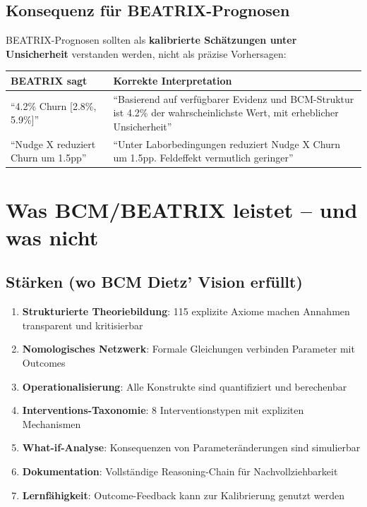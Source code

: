 \documentclass[12pt,a4paper]{article}
\begin{document}
\subsection{Konsequenz für BEATRIX-Prognosen}

BEATRIX-Prognosen sollten als \textbf{kalibrierte Schätzungen unter Unsicherheit} verstanden werden, nicht als präzise Vorhersagen:

\begin{center}
\begin{tabular}{p{5cm}p{7cm}}
\toprule
\textbf{BEATRIX sagt} & \textbf{Korrekte Interpretation}\\
\midrule
``4.2\% Churn [2.8\%, 5.9\%]'' & ``Basierend auf verfügbarer Evidenz und BCM-Struktur ist 4.2\% der wahrscheinlichste Wert, mit erheblicher Unsicherheit''\\
\midrule
``Nudge X reduziert Churn um 1.5pp'' & ``Unter Laborbedingungen reduziert Nudge X Churn um 1.5pp. Feldeffekt vermutlich geringer''\\
\bottomrule
\end{tabular}
\end{center}

\section{Was BCM/BEATRIX leistet -- und was nicht}

\subsection{Stärken (wo BCM Dietz' Vision erfüllt)}

\begin{enumerate}
    \item \textbf{Strukturierte Theoriebildung}: 115 explizite Axiome machen Annahmen transparent und kritisierbar
    \item \textbf{Nomologisches Netzwerk}: Formale Gleichungen verbinden Parameter mit Outcomes
    \item \textbf{Operationalisierung}: Alle Konstrukte sind quantifiziert und berechenbar
    \item \textbf{Interventions-Taxonomie}: 8 Interventionstypen mit expliziten Mechanismen
    \item \textbf{What-if-Analyse}: Konsequenzen von Parameteränderungen sind simulierbar
    \item \textbf{Dokumentation}: Vollständige Reasoning-Chain für Nachvollziehbarkeit
    \item \textbf{Lernfähigkeit}: Outcome-Feedback kann zur Kalibrierung genutzt werden
\end{enumerate}
\end{document}
